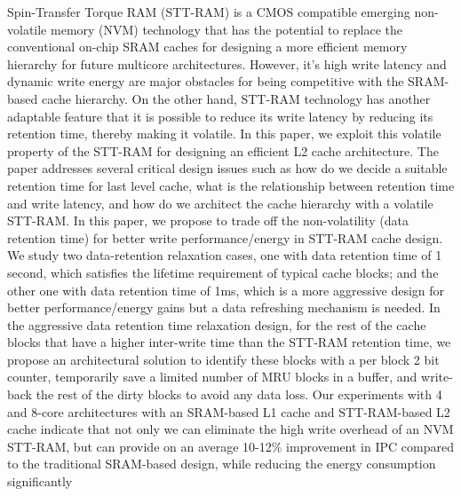 \singlespacing

Spin-Transfer Torque RAM (STT-RAM) is a CMOS compatible emerging non-volatile memory (NVM)
technology that has the potential to replace the conventional
on-chip SRAM caches for designing a more efficient memory hierarchy for
future multicore architectures.
However, it's high write latency and dynamic
write energy are major obstacles for being competitive with the SRAM-based cache hierarchy.
On the other hand, STT-RAM technology has another adaptable feature that it is possible to reduce its write
latency by reducing its retention time, thereby making it volatile.
In this paper, we exploit this volatile property of the STT-RAM for designing an efficient L2 cache
architecture. The paper addresses several critical design issues such as how do we decide a suitable retention time for last level cache,
what is the relationship between retention time and write latency,
and how do we architect the cache hierarchy with a volatile STT-RAM.
In this paper, we propose to trade off the non-volatility (data retention time)
for better write performance/energy in STT-RAM cache design. We study two
data-retention relaxation cases, one with data retention time of 1 second, which satisfies the lifetime requirement of typical cache blocks; and the other one with data retention time of 1ms, which is a more aggressive design for better performance/energy gains but a data refreshing mechanism is needed.
In the aggressive data retention time relaxation design, for the rest of the cache blocks that have a higher inter-write
time than the STT-RAM retention time, we propose an architectural solution to identify these blocks
with a per block 2 bit counter, temporarily save a limited number of MRU blocks in a buffer,
and write-back the rest of the dirty blocks to avoid any data loss.
Our experiments with 4 and 8-core architectures with an SRAM-based L1 cache and STT-RAM-based L2 cache
indicate that not only we can eliminate the high write overhead of an NVM STT-RAM, but can provide
on an average 10-12\% improvement in IPC compared to the traditional SRAM-based
design, while reducing the energy consumption significantly

